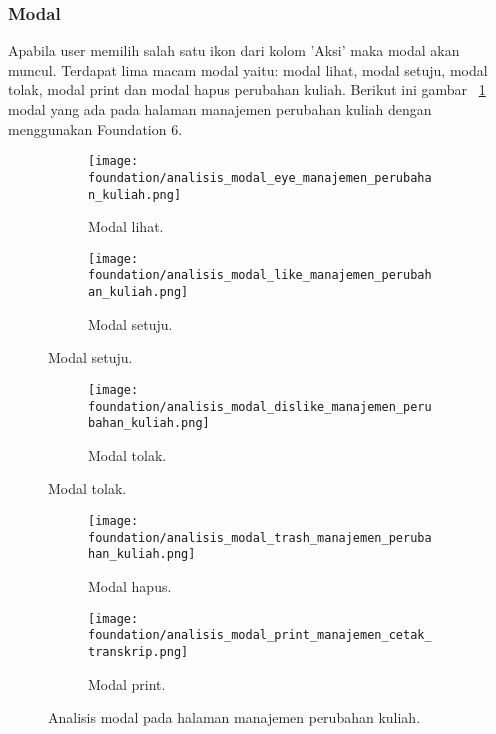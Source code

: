 \subsubsection{Modal}
Apabila user memilih salah satu ikon dari kolom 'Aksi' maka modal akan muncul. Terdapat lima macam modal yaitu: modal lihat, modal setuju, modal tolak, modal print dan modal hapus perubahan kuliah. 
Berikut ini gambar ~\ref{fig:analisisModalManajemenPerubahanKuliah} modal yang ada pada halaman manajemen perubahan kuliah dengan menggunakan Foundation 6.
\begin{figure} [H]	
	\centering
	\begin{subfigure}[b]{0.45\linewidth} 
		\texttt{[image: foundation/analisis\_modal\_eye\_manajemen\_perubahan\_kuliah.png]}
		\caption{Modal lihat.}  
	\end{subfigure}	
	\begin{subfigure}[b]{0.3\linewidth}   
		\texttt{[image: foundation/analisis\_modal\_like\_manajemen\_perubahan\_kuliah.png]}
		\caption{Modal setuju.}
	\end{subfigure}
\end{figure}

\begin{figure} [H] 
	\centering
	\ContinuedFloat
	\begin{subfigure}[b]{0.6\linewidth}
		\texttt{[image: foundation/analisis\_modal\_dislike\_manajemen\_perubahan\_kuliah.png]}
		\caption{Modal tolak.}  
	\end{subfigure}
\end{figure}

\begin{figure} [H] 
	\centering
	\ContinuedFloat
	\begin{subfigure}[b]{0.35\linewidth} 
		\texttt{[image: foundation/analisis\_modal\_trash\_manajemen\_perubahan\_kuliah.png]}
		\caption{Modal hapus.}
	\end{subfigure}
	\begin{subfigure}[b]{0.55\linewidth}
		\texttt{[image: foundation/analisis\_modal\_print\_manajemen\_cetak\_transkrip.png]}
		\caption{Modal print.}  
	\end{subfigure}	 
	\caption{Analisis modal pada halaman manajemen perubahan kuliah.}
	\label{fig:analisisModalManajemenPerubahanKuliah}
\end{figure}

